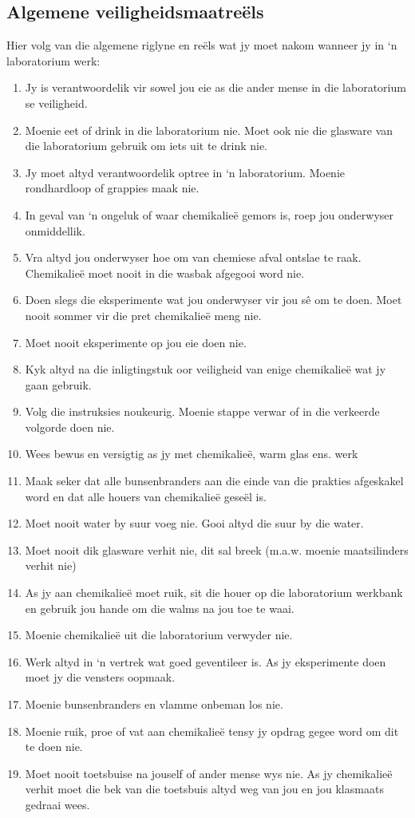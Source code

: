 \subsection*{Algemene veiligheidsmaatreëls}
            \nopagebreak
Hier volg van die algemene riglyne en reëls wat jy moet nakom wanneer jy in ‘n laboratorium werk:
\begin{enumerate}[noitemsep, label=\textbf{\arabic*}. ] 
\item Jy is verantwoordelik vir sowel jou eie as die ander mense in die laboratorium se veiligheid.
\item Moenie eet of drink in die laboratorium nie. Moet ook nie die glasware van die laboratorium gebruik om iets uit te drink nie.
\item Jy moet altyd verantwoordelik optree in ‘n laboratorium. Moenie rondhardloop of grappies maak nie.
\item In geval van ‘n ongeluk of waar chemikalieë gemors is, roep jou onderwyser onmiddellik.
\item Vra altyd jou onderwyser hoe om van chemiese afval ontslae te raak. Chemikalieë moet nooit in die wasbak afgegooi word nie.
\item Doen slegs die eksperimente wat jou onderwyser vir jou sê om te doen. Moet nooit sommer vir die pret chemikalieë meng nie.
\item Moet nooit eksperimente op jou eie doen nie. 
\item Kyk altyd na die inligtingstuk oor veiligheid van enige chemikalieë wat jy gaan gebruik. 
\item Volg die instruksies noukeurig. Moenie stappe verwar of in die verkeerde volgorde doen nie. 
\item Wees bewus en versigtig as jy met chemikalieë, warm glas ens. werk  
\item Maak seker dat alle bunsenbranders aan die einde van die prakties afgeskakel word en dat alle houers van chemikalieë geseël is.
\item Moet nooit water by suur voeg nie. Gooi altyd die suur by die water.
\item Moet nooit dik glasware verhit nie, dit sal breek (m.a.w. moenie maatsilinders verhit nie)
\item As jy aan chemikalieë moet ruik, sit die houer op die laboratorium werkbank en gebruik jou hande om die walms na jou toe te waai.
\item Moenie chemikalieë uit die laboratorium verwyder nie.
\item Werk altyd in ‘n vertrek wat goed geventileer is. As jy eksperimente doen moet jy die vensters oopmaak.
\item Moenie bunsenbranders en vlamme onbeman los nie.
\item Moenie ruik, proe of vat aan chemikalieë tensy jy opdrag gegee word om dit te doen nie.
\item Moet nooit toetsbuise na jouself of ander mense wys nie. As jy chemikalieë verhit moet die bek van die toetsbuis altyd weg van jou en jou klasmaats gedraai wees.
\end{enumerate}
\par 
